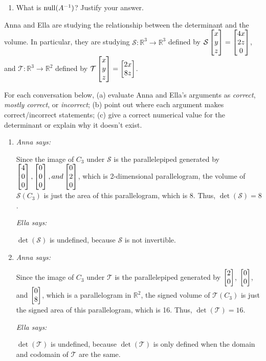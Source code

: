 \begin{exercises}
\begin{problist}
\begin{enumerate}
			\item What is $\operatorname{null}(A^{-1})$? Justify your answer.
		\end{enumerate}
		\prob Anna and Ella are studying the relationship between the determinant
		and the volume. In particular, they are studying $\mathcal{S}:\mathbb{R}^{3}
		\rightarrow\mathbb{R}^{3}$ defined by $\mathcal{S}\begin{bmatrix}x \\ y \\ z\end{bmatrix}=\begin{bmatrix}4x \\ 2z \\ 0\end{bmatrix}$, and
		$\mathcal{T}:\mathbb{R}^{3}\rightarrow\mathbb{R}^{2}$ defined by
		$\mathcal{T}\begin{bmatrix}x \\ y \\ z\end{bmatrix}=\begin{bmatrix}2x \\ 8z\end{bmatrix}$.

		For each conversation below, (a) evaluate Anna and Ella's arguments as \emph{correct},
		\emph{mostly correct}, or \emph{incorrect}; (b) point out where each argument
		makes correct/incorrect statements; (c) give a correct numerical value
		for the determinant or explain why it doesn't exist.
		\begin{enumerate}
			\item \emph{Anna says:}

				Since the image of $C_{3}$ under $\mathcal{S}$ is the
				parallelepiped generated by
				$\begin{bmatrix}4 \\ 0 \\ 0\end{bmatrix},\begin{bmatrix}0 \\ 0 \\ 0\end{bmatrix}, and \begin{bmatrix}0 \\ 2 \\ 0\end{bmatrix}$,
				which is 2-dimensional parallelogram, the volume of
				$\mathcal{S}(C_{3})$ is just the area of this parallelogram, which
				is 8. Thus, $\det(\mathcal{S})=8$.

				\emph{Ella says:}

				$\det(\mathcal{S})$ is undefined, because $\mathcal{S}$ is not
				invertible.

			\item \emph{Anna says:}

				Since the image of $C_{3}$ under $\mathcal{T}$ is the
				parallelepiped generated by $\begin{bmatrix}2 \\ 0\end{bmatrix}$, $\begin{bmatrix}0 \\ 0\end{bmatrix}$,
				and $\begin{bmatrix}0 \\ 8\end{bmatrix}$, which is a parallelogram in $\mathbb{R}^{2}$,
				the signed volume of $\mathcal{T}(C_{3})$ is just the signed
				area of this parallelogram, which is 16. Thus,
				$\det(\mathcal{T})=16$.

				\emph{Ella says:}

				$\det(\mathcal{T})$ is undefined, because $\det(\mathcal{T})$ is
				only defined when the domain and codomain of $\mathcal{T}$ are
				the same.
		\end{enumerate}
	\end{problist}
\end{exercises}